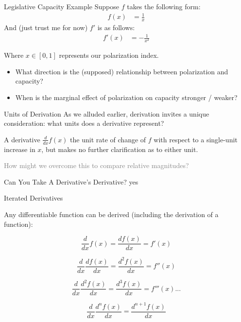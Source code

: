 \documentclass[10pt]{beamer}
\begin{document}
\begin{frame}{Legislative Capacity Example}
    Suppose $f$ takes the following form:
    \begin{align*}
        f(x) &= \frac{1}{x}
    \end{align*}
    And (just trust me for now) $f'$ is as follows:
    \begin{align*}
        f'(x) &= -\frac{1}{x^2}
    \end{align*}

    Where $x \in [0,1]$ represents our polarization index.

    \begin{itemize}
        \item What direction is the (supposed) relationship between polarization and capacity?
        \item When is the marginal effect of polarization on capacity stronger / weaker?
    \end{itemize}
\end{frame}

\begin{frame}{Units of Derivation}
As we alluded earlier, derivation invites a unique consideration: what units does a derivative represent?

\pause

A derivative $\frac{d}{dx}f(x)$ the unit rate of change of $f$ with respect to a single-unit increase in $x$, but makes no further clarification as to either unit.

\vspace{1cm}
\textcolor{gray}{How might we overcome this to compare relative magnitudes?}
\end{frame}



\begin{frame}{Can You Take A Derivative's Derivative?}
    \pause
    yes
\end{frame}

\begin{frame}{Iterated Derivatives}

    Any differentiable function can be derived (including the derivation of a function):

    \[\frac{d}{dx} f(x) = \frac{df(x)}{d x} = f'(x)\]

    \[\frac{d}{dx} \frac{d f(x)}{dx} = \frac{d^2 f(x)}{dx} = f''(x)\]

    \[\frac{d}{dx} \frac{d^2 f(x)}{dx} = \frac{d^3 f(x)}{dx} = f'''(x) ...\]

    \[\frac{d}{dx}\frac{d^n f(x)}{dx} = \frac{d^{n+1}f(x)}{dx}\]
\end{frame}
\end{document}
